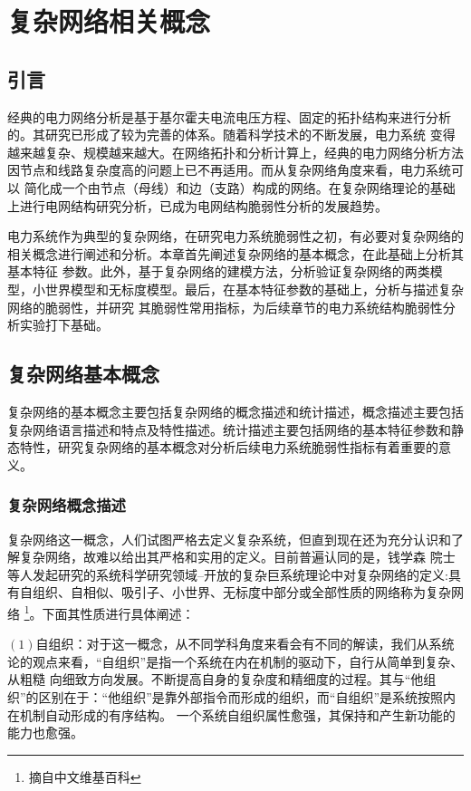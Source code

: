 \chapter{复杂网络相关概念}
\label{cha:model}

\section{引言}
\label{sec:index2}
经典的电力网络分析是基于基尔霍夫电流电压方程、固定的拓扑结构来进行分析的。其研究已形成了较为完善的体系\cite{refs60}。随着科学技术的不断发展，电力系统
变得越来越复杂、规模越来越大。在网络拓扑和分析计算上，经典的电力网络分析方法因节点和线路复杂度高的问题上已不再适用。而从复杂网络角度来看，电力系统可以
简化成一个由节点（母线）和边（支路）构成的网络。在复杂网络理论的基础上进行电网结构研究分析，已成为电网结构脆弱性分析的发展趋势。

电力系统作为典型的复杂网络，在研究电力系统脆弱性之初，有必要对复杂网络的相关概念进行阐述和分析。本章首先阐述复杂网络的基本概念，在此基础上分析其基本特征
参数。此外，基于复杂网络的建模方法，分析验证复杂网络的两类模型，小世界模型和无标度模型。最后，在基本特征参数的基础上，分析与描述复杂网络的脆弱性，并研究
其脆弱性常用指标，为后续章节的电力系统结构脆弱性分析实验打下基础。

\section{复杂网络基本概念}
\label{sec:powersys}
复杂网络的基本概念主要包括复杂网络的概念描述和统计描述，概念描述主要包括复杂网络语言描述和特点及特性描述。统计描述主要包括网络的基本特征参数和静
态特性，研究复杂网络的基本概念对分析后续电力系统脆弱性指标有着重要的意义。

\subsection{复杂网络概念描述}
\label{sec:composite}
复杂网络这一概念，人们试图严格去定义复杂系统，但直到现在还为充分认识和了解复杂网络，故难以给出其严格和实用的定义\cite{refs61}。目前普遍认同的是，钱学森
院士等人发起研究的系统科学研究领域--开放的复杂巨系统理论中对复杂网络的定义:具有自组织、自相似、吸引子、小世界、无标度中部分或全部性质的网络称为复杂网络
\footnote{摘自中文维基百科}。下面其性质进行具体阐述：

$(1)$自组织：对于这一概念，从不同学科角度来看会有不同的解读，我们从系统论的观点来看，“自组织”是指一个系统在内在机制的驱动下，自行从简单到复杂、从粗糙
向细致方向发展。不断提高自身的复杂度和精细度的过程。其与“他组织”的区别在于：“他组织”是靠外部指令而形成的组织，而“自组织”是系统按照内在机制自动形成的有序结构。
一个系统自组织属性愈强，其保持和产生新功能的能力也愈强。

